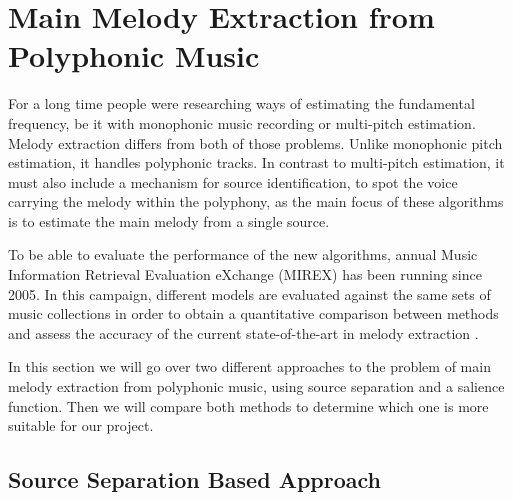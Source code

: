 \vspace{20pt}

\section{Main Melody Extraction from Polyphonic Music}

For a long time people were researching ways of estimating the fundamental frequency, be it with monophonic music recording or multi-pitch estimation. Melody extraction differs from both of those problems. Unlike monophonic pitch estimation, it handles polyphonic tracks. In contrast to multi-pitch estimation, it must also include a mechanism for source identification, to spot the voice carrying the melody within the polyphony, as the main focus of these algorithms is to estimate the main melody from a single source. 

To be able to evaluate the performance of the new algorithms, annual Music Information Retrieval Evaluation eXchange (MIREX) has been running since 2005. In this campaign, different models are evaluated against the same sets of music collections in order to obtain a quantitative comparison between methods and assess the accuracy of the current state-of-the-art in melody extraction \cite{comparison}.

In this section we will go over two different approaches to the problem of main melody extraction from polyphonic music, using source separation and a salience function. Then we will compare both methods to determine which one is more suitable for our project.

\vspace{10pt}

\subsection{Source Separation Based Approach}

